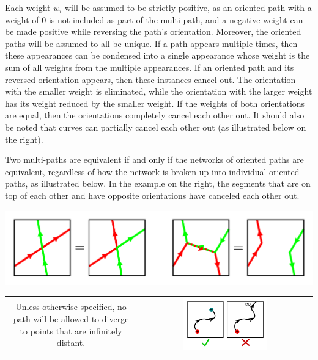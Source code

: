 \documentclass{book}
\begin{document}
Each weight \(w_i\) will be assumed to be strictly positive, as an oriented path with a weight of 0 is not included as part of the multi-path, and a negative weight can be made positive while reversing the path's orientation. Moreover, the oriented paths will be assumed to all be unique. If a path appears multiple times, then these appearances can be condensed into a single appearance whose weight is the sum of all weights from the multiple appearances. If an oriented path and its reversed orientation appears, then these instances cancel out. The orientation with the smaller weight is eliminated, while the orientation with the larger weight has its weight reduced by the smaller weight. If the weights of both orientations are equal, then the orientations completely cancel each other out. It should also be noted that curves can partially cancel each other out (as illustrated below on the right). 

Two multi-paths are equivalent if and only if the networks of oriented paths are equivalent, regardless of how the network is broken up into individual oriented paths, as illustrated below. In the example on the right, the segments that are on top of each other and have opposite orientations have canceled each other out.    
\begin{center}
\includegraphics[scale = 0.5]{Multi-structures/Multipaths/multi-path_decomposition}
\end{center}

\begin{center}
\begin{tabular}{cc}
\parbox{0.5\textwidth}{
Unless otherwise specified, no path will be allowed to diverge to points that are infinitely distant.
} & \parbox{0.5\textwidth}{
\includegraphics[width = 0.5\textwidth]{Multi-structures/Multipaths/no_infinite_paths}
}
\end{tabular}
\end{center}
\end{document}
